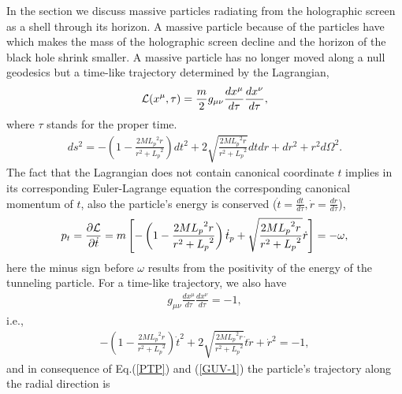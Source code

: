 \documentclass[12pt]{article}
\begin{document}
In the section  we discuss  massive particles radiating from the holographic screen as a shell through its horizon. A massive particle
because of the particles have   which makes the mass of the holographic screen decline and the horizon of the black hole shrink smaller.  A massive particle
has no longer moved along a null geodesics  but  a time-like trajectory determined by the  Lagrangian,
\begin{eqnarray}
{{\cal L}(x^\mu, \tau)} = \frac{m}{2} g_{\mu\nu} \frac{dx^\mu}{d\tau} \frac{dx^\nu}{d\tau},
\end{eqnarray}
where $\tau$ stands for the proper time.
\begin{eqnarray}
ds^2 = - \left(1 - \frac{2 M {L_p}^2 r}{r^2+{L_p}^2} \right) dt^2 + 2 \sqrt{\frac{2 M {L_p}^2 r}{r^2+{L_p}^2}}dtdr + dr^2 +r^2 d\Omega^2.
\end{eqnarray}
The fact that the Lagrangian does not contain  canonical coordinate $t$  implies
in  its corresponding Euler-Lagrange equation the corresponding canonical momentum of $t$, also the particle's energy is conserved ($\dot{t} = \frac{dt}{d\tau}, \dot{r} = \frac{dr}{d\tau}$),
\begin{eqnarray}
 p_{t} = \frac{\partial{\cal L}}{\partial \dot{t}} =m\left[  -\left(1 - \frac{2 M {L_p}^2 r}{r^2+{L_p}^2} \right) {\dot t_p} +\sqrt{\frac{2 M {L_p}^2 r}{r^2+{L_p}^2}}{\dot r}\right]= -\omega,   \label{PTP}
\end{eqnarray}
here  the minus sign before $\omega$ results from  the positivity of the energy  of the tunneling particle.
For a time-like trajectory, we also have
\begin{eqnarray}
  g_{\mu\nu} \frac{dx^\mu}{d\tau} \frac{dx^\nu}{d\tau} = -1,
\end{eqnarray}
i.e.,
\begin{eqnarray}
- \left(1 - \frac{2 M {L_p}^2 r}{r^2+{L_p}^2} \right){\dot t}^2 +2 \sqrt{\frac{2 M {L_p}^2 r}{r^2+{L_p}^2}}{\dot t}{\dot r} +{\dot r}^2 =   -1,     \label{GUV-1}
\end{eqnarray}
and in consequence of Eq.(\ref{PTP}) and (\ref{GUV-1})  the  particle's trajectory  along
the radial direction is
\end{document}
